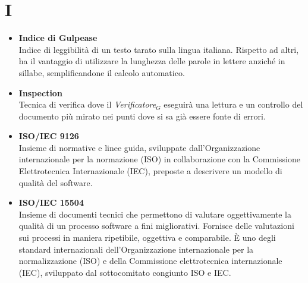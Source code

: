 \chapter{I} \label{I}
\begin{itemize}
	\item \textbf{Indice di Gulpease}\\
	Indice di leggibilità di un testo tarato sulla lingua italiana.
	Rispetto ad altri, ha il vantaggio di utilizzare la lunghezza delle parole in lettere anziché in sillabe, semplificandone il calcolo automatico.
	
	\item \textbf{Inspection}\\
	Tecnica di verifica dove il	\textit{Verificatore$_G$} eseguirà una lettura e un controllo del documento più mirato nei punti dove si sa già essere fonte di errori.
		
	\item \textbf{ISO/IEC 9126}\\
	Insieme di normative e linee guida, sviluppate dall’Organizzazione internazionale per la
	normazione (ISO) in collaborazione con la Commissione Elettrotecnica Internazionale (IEC),
	preposte a descrivere un modello di qualità del software.
	
	\item \textbf{ISO/IEC 15504}\\
	Insieme di documenti tecnici che permettono di valutare oggettivamente la qualità di un processo software a fini migliorativi. 
	Fornisce delle valutazioni sui processi in maniera ripetibile, oggettiva e comparabile. È uno degli standard internazionali dell’Organizzazione internazionale per la normalizzazione (ISO) e della Commissione elettrotecnica internazionale
	(IEC), sviluppato dal sottocomitato congiunto ISO e IEC.

	
	
	
\end{itemize}
